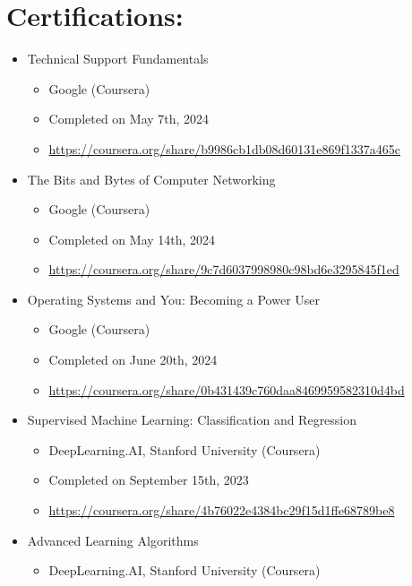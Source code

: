 \documentclass[12pt, oneside, a4paper]{article}
\begin{document}
\section*{Certifications:}
\begin{itemize}
    \scriptsize
    \item Technical Support Fundamentals
          \begin{itemize}
              \item Google (Coursera)
              \item Completed on May 7th, 2024
              \item \url{https://coursera.org/share/b9986cb1db08d60131e869f1337a465c}
          \end{itemize}
    \item The Bits and Bytes of Computer Networking
          \begin{itemize}
              \item Google (Coursera) 
              \item Completed on May 14th, 2024
              \item \url{https://coursera.org/share/9c7d6037998980c98bd6e3295845f1ed}
          \end{itemize}
    \item Operating Systems and You: Becoming a Power User
          \begin{itemize}
              \item Google (Coursera)
              \item Completed on June 20th, 2024
              \item \url{https://coursera.org/share/0b431439c760daa8469959582310d4bd}
          \end{itemize}
    \item Supervised Machine Learning: Classification and Regression
          \begin{itemize}
              \item DeepLearning.AI, Stanford University (Coursera)
              \item Completed on September 15th, 2023
              \item \url{https://coursera.org/share/4b76022e4384bc29f15d1ffe68789be8}
          \end{itemize}
    \item Advanced Learning Algorithms
          \begin{itemize}
              \item DeepLearning.AI, Stanford University (Coursera)

\end{itemize}
\end{itemize}
\end{document}

